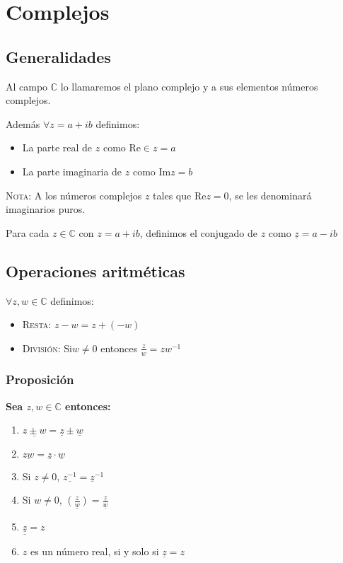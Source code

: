 \chapter{Complejos}
\section{Generalidades}
\begin{definition}
Al campo $\mathbb{C}$ lo llamaremos el plano complejo y a sus elementos números complejos.
\end{definition}

Además $\forall z =a+ib$ definimos:

\begin{itemize}
  \item La parte real de $z$ como $\text{Re} \in z=a$
  \item La parte imaginaria de $z$ como $\text{Im} z=b$
\end{itemize}

\textsc{Nota:} A los números complejos $z$ tales que $\text{Re} z = 0$, se les denominará imaginarios puros. 

\begin{definition}[Conjugado]
Para cada $z \in \mathbb{C}$ con $z=a+ib$, definimos el conjugado de $z$  como $\underline{z}= a-ib$
\end{definition}
\section{Operaciones aritméticas}

$\forall z, w \in \mathbb{C}$ definimos:

\begin{itemize}
  \item \textsc{Resta: } $z-w=z+(-w)$
  \item \textsc{División: }Si$w \neq 0$ entonces $\frac{z}{w} = zw^{-1}$
\end{itemize}

\subsection{Proposición}
\textbf{Sea $z,w \in \mathbb{C}$ entonces:}
\begin{enumerate}
  \item $\underline{z \pm w} = \underline{z} \pm \underline{w}$
  \item $\underline{zw}= \underline{z} \cdot \underline{w}$
  \item Si $z \neq 0$, $\underline{z^{-1}}=\underline{z}^{-1}$
  \item Si $w \neq 0$, $\underline{\left(\displaystyle\frac{z}{w}\right)} = \displaystyle\frac{\underline{z}}{\underline{w}}$
  \item $\underline{\underline{z}} = z$
  \item $z$ es un número real, si y solo si $\underline{z}=z$
\end{enumerate}

